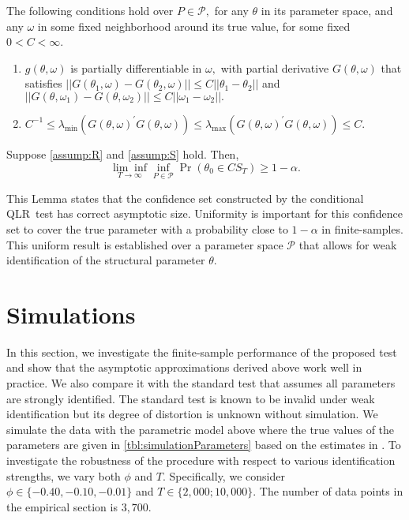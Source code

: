 \documentclass[11pt, letterpaper, twoside]{article}
\begin{document}
\begin{assumpS}
    \label{assump:S}
The following conditions hold over $P\in \mathcal{P},$ for any $\theta $ in its parameter space, and any $\omega $ in some fixed neighborhood around its true value, for some fixed $0<C<\infty$.
%
\begin{enumerate}
    \item $g(\theta ,\omega )$ is partially differentiable in $\omega ,$ with partial derivative $G(\theta ,\omega )$ that satisfies $||G(\theta _{1},\omega )-G(\theta _{2},\omega )||\leq C||\theta _{1}-\theta _{2}||$ and $||G(\theta ,\omega _{1})-G(\theta ,\omega _{2})||\leq C||\omega _{1}-\omega _{2}||.$
%
    \item $C^{-1}\leq \lambda_{\min }(G(\theta ,\omega )^{\prime }G(\theta ,\omega ))\leq \lambda_{\max }(G(\theta ,\omega )^{\prime }G(\theta ,\omega ))\leq C$.
\end{enumerate}
\end{assumpS}

\begin{theorem}
    \label{Lemma CS}
    Suppose \cref{assump:R} and \cref{assump:S} hold. Then, 
%
    \begin{equation*} 
        \underset{T\rightarrow \infty }{\lim \inf }\underset{P\in \mathcal{P}}{\inf }\Pr \left( \theta _{0}\in CS_{T}\right) \geq 1-\alpha .
    \end{equation*}
\end{theorem}

This Lemma states that the confidence set constructed by the conditional QLR\ test has correct asymptotic size. Uniformity is important for this confidence set to cover the true parameter with a probability close to $1-\alpha $ in finite-samples. This uniform result is established over a parameter space $\mathcal{P}$ that allows for weak identification of the structural parameter $\theta$.


\section{Simulations}\label{sec:simulation}

In this section, we investigate the finite-sample performance of the proposed test and show that the asymptotic approximations derived above work well in practice. We also compare it with the standard test that assumes all parameters are strongly identified. The standard test is known to be invalid under weak identification but its degree of distortion is unknown without simulation. We simulate the data with the parametric model above where the true values of the parameters are given in \cref{tbl:simulationParameters} based on the estimates in \textcite{han2018leverage}. To investigate the robustness of the procedure with respect to various identification strengths, we vary both $\phi$ and $T$. Specifically, we consider $\phi \in \lbrace -0.40, -0.10, -0.01 \rbrace$ and $T \in \lbrace 2,000; 10,000 \rbrace$. The number of data points in the empirical section is $3,700$. 
\end{document}
